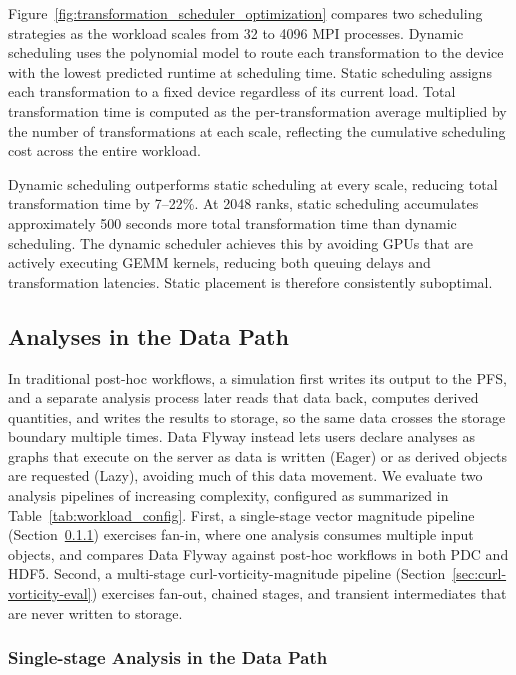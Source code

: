 Figure~\ref{fig:transformation_scheduler_optimization} compares two scheduling strategies as the workload scales from 32 to 4096 MPI processes. Dynamic scheduling uses the polynomial model to route each transformation to the device with the lowest predicted runtime at scheduling time. Static scheduling assigns each transformation to a fixed device regardless of its current load. Total transformation time is computed as the per-transformation average multiplied by the number of transformations at each scale, reflecting the cumulative scheduling cost across the entire workload.

Dynamic scheduling outperforms static scheduling at every scale, reducing total transformation time by 7--22\%. At 2048 ranks, static scheduling accumulates approximately 500 seconds more total transformation time than dynamic scheduling. The dynamic scheduler achieves this by avoiding GPUs that are actively executing GEMM kernels, reducing both queuing delays and transformation latencies. Static placement is therefore consistently suboptimal.

\subsection{Analyses in the Data Path}
\label{sec:analysis-eval}

In traditional post-hoc workflows, a simulation first writes its output to the PFS, and a separate analysis process later reads that data back, computes derived quantities, and writes the results to storage, so the same data crosses the storage boundary multiple times. Data Flyway instead lets users declare analyses as graphs that execute on the server as data is written (Eager) or as derived objects are requested (Lazy), avoiding much of this data movement. We evaluate two analysis pipelines of increasing complexity, configured as summarized in Table~\ref{tab:workload_config}. First, a single-stage vector magnitude pipeline (Section~\ref{sec:magnitude-eval}) exercises fan-in, where one analysis consumes multiple input objects, and compares Data Flyway against post-hoc workflows in both PDC and HDF5. Second, a multi-stage curl-vorticity-magnitude pipeline (Section~\ref{sec:curl-vorticity-eval}) exercises fan-out, chained stages, and transient intermediates that are never written to storage.

\subsubsection{Single-stage Analysis in the Data Path}
\label{sec:magnitude-eval}

